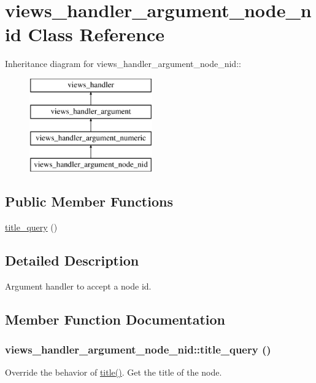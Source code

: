 \hypertarget{classviews__handler__argument__node__nid}{
\section{views\_\-handler\_\-argument\_\-node\_\-nid Class Reference}
\label{classviews__handler__argument__node__nid}
}
Inheritance diagram for views\_\-handler\_\-argument\_\-node\_\-nid::\begin{figure}[H]
\begin{center}
\leavevmode
\includegraphics[height=4cm]{classviews__handler__argument__node__nid}
\end{center}
\end{figure}
\subsection*{Public Member Functions}
\begin{DoxyCompactItemize}
\item 
\hyperlink{classviews__handler__argument__node__nid_a7c448ef89d94d7b103a162128ee9bbf8}{title\_\-query} ()
\end{DoxyCompactItemize}


\subsection{Detailed Description}
Argument handler to accept a node id. 

\subsection{Member Function Documentation}
\hypertarget{classviews__handler__argument__node__nid_a7c448ef89d94d7b103a162128ee9bbf8}{
\subsubsection[{title\_\-query}]{\setlength{\rightskip}{0pt plus 5cm}views\_\-handler\_\-argument\_\-node\_\-nid::title\_\-query ()}}
\label{classviews__handler__argument__node__nid_a7c448ef89d94d7b103a162128ee9bbf8}
Override the behavior of \hyperlink{classviews__handler__argument__numeric_a480758dbcde899b5483b091e51e2bf39}{title()}. Get the title of the node. 

